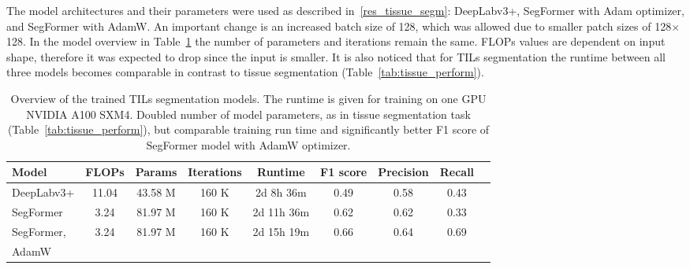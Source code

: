 The model architectures and their parameters were used as described in~\ref*{res_tissue_segm}:
DeepLabv3+, SegFormer with Adam optimizer, and SegFormer with AdamW. An important
change is an increased batch size of 128, which was allowed due to smaller patch
sizes of 128$\times$128. In the model overview in Table~\ref*{tab:tils_perform}
the number of parameters and
iterations remain the same. FLOPs values are dependent on input shape, therefore
it was expected to drop since the input is smaller.
It is also noticed that for TILs segmentation the runtime between all three models
becomes comparable in contrast to tissue segmentation (Table~\ref*{tab:tissue_perform}).

\begin{table}[h!]
    \centering
    \begin{tabular}{ l c c c c c c c c}
        \hline
        Model & FLOPs & Params & Iterations & Runtime & F1 score & Precision & Recall\\
        \hline
        DeepLabv3+ & 11.04 & 43.58 M & 160 K & 2d 8h 36m & 0.49 & 0.58 & 0.43\\
        SegFormer & 3.24 & 81.97 M & 160 K  & 2d 11h 36m & 0.62 & 0.62 & 0.33\\
        SegFormer, & \multirow{2}{*}{3.24} & \multirow{2}{*}{81.97 M} & \multirow{2}{*}{160 K} & \multirow{2}{*}{2d 15h 19m} & \multirow{2}{*}{0.66} & \multirow{2}{*}{0.64} & \multirow{2}{*}{0.69}\\
        AdamW & & & & & & & & \\
        \hline
    \end{tabular}
\caption{\label{tab:tils_perform} Overview of the trained TILs segmentation models. The runtime is given for training on one GPU NVIDIA A100 SXM4.
Doubled number of model parameters, as in tissue segmentation task (Table~\ref*{tab:tissue_perform}), but comparable training run time and significantly better F1 score of SegFormer model with AdamW optimizer.}
\end{table}

